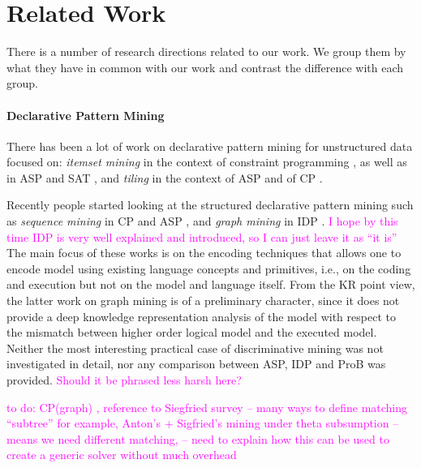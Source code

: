 \documentclass{article}
\theoremstyle{definition}
\newcommand{\sergey}[1]{\textcolor{magenta}{\marginpar{\sc Sergey} #1}}
\begin{document}

\section{Related Work}
There is a number of research directions related to our work. We group them by what they have in common with our work and contrast the difference with each group.

\paragraph{Declarative Pattern Mining} There has been a lot of work on declarative pattern mining for unstructured data focused on: \textit{itemset mining} in the context of constraint programming \citep{tias_original,mining_cp_extra,tias_declarative_pattern_mining}, as well as in ASP \citep{asp_itemset} and SAT \citep{itemset_sat}, and \textit{tiling} in the context of ASP \citep{relational_decomposition} and of CP \citep{ranked_tiling}. 

Recently people started looking at the structured declarative pattern mining such as \textit{sequence mining} in CP \citep{cp_sequence_mining} and ASP \citep{rennes_asp_sequences}, and \textit{graph mining} in IDP \citep{ilp_graph_mining}. \sergey{I hope by this time IDP is very well explained and introduced, so I can just leave it as ``it is''} The main focus of these works is on the encoding techniques that allows one to encode model using existing language concepts and primitives, i.e., on the coding and execution but not on the model and language itself. From the KR point view, the latter work on graph mining is of a preliminary character, since it does not provide a deep knowledge representation analysis of the model with respect to the mismatch between higher order logical model and the executed model. Neither the most interesting practical case of discriminative mining was not investigated in detail, nor any comparison between ASP, IDP and ProB was provided. \sergey{Should it be phrased less harsh here?}

\sergey{to do: CP(graph) \citep{cp_graph}, reference to Siegfried survey \citep{subtree_overview} -- many ways to define matching ``subtree'' for example, Anton's + Sigfried's mining under theta subsumption \citep{theta_subsumption} -- means we need different matching, \citep{declarative_structured_language} -- need to explain how this can be used to create a generic solver without much overhead}
\end{document}
